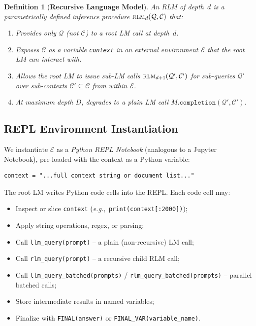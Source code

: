 \documentclass[journal, 10pt, letterpaper]{IEEEtran}
\newcommand{\rlm}{\textsc{rlm}}
\newcommand{\code}[1]{\texttt{#1}}
\newcommand{\eg}{\textit{e.g.},\ }
\newtheorem{definition}{Definition}
\begin{document}
\begin{definition}[\textbf{Recursive Language Model}]
An RLM of depth~$d$ is a parametrically defined inference procedure
$\text{\rlm}_d(\mathcal{Q},\mathcal{C})$ that:
\begin{enumerate}
  \item Provides only $\mathcal{Q}$ (not $\mathcal{C}$) to a root LM call at
    depth~$d$.
  \item Exposes $\mathcal{C}$ as a variable \code{context} in an external
    environment $\mathcal{E}$ that the root LM can interact with.
  \item Allows the root LM to issue sub-LM calls
    $\text{\rlm}_{d+1}(\mathcal{Q}', \mathcal{C}')$ for sub-queries
    $\mathcal{Q}'$ over sub-contexts $\mathcal{C}' \subseteq \mathcal{C}$
    from within $\mathcal{E}$.
  \item At maximum depth $D$, degrades to a plain LM call
    $M.\code{completion}(\mathcal{Q}',\mathcal{C}')$.
\end{enumerate}
\end{definition}

\subsection{REPL Environment Instantiation}
\label{sec:repl}

We instantiate $\mathcal{E}$ as a \emph{Python REPL Notebook} (analogous to
a Jupyter Notebook), pre-loaded with the context as a Python variable:

\begin{lstlisting}[caption={Context loading in the REPL environment.}]
context = "...full context string or document list..."
\end{lstlisting}

The root LM writes Python code cells into the REPL.  Each code cell may:
\begin{itemize}
  \item Inspect or slice \code{context} (\eg \code{print(context[:2000])});
  \item Apply string operations, regex, or parsing;
  \item Call \code{llm\_query(prompt)} -- a plain (non-recursive) LM call;
  \item Call \code{rlm\_query(prompt)} -- a recursive child RLM call;
  \item Call \code{llm\_query\_batched(prompts)} / \code{rlm\_query\_batched(prompts)} -- parallel batched calls;
  \item Store intermediate results in named variables;
  \item Finalize with \code{FINAL(answer)} or \code{FINAL\_VAR(variable\_name)}.
\end{itemize}
\end{document}
